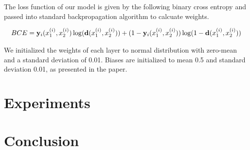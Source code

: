 \documentclass[runningheads]{llncs}
\begin{document}
The loss function of our model is given by the following binary cross entropy and passed into standard backpropagation algorithm to calcuate weights.

\begin{equation}
    \mathnormal{BCE} = 
    \mathbf{y}_{i}(\mathnormal{x}_{1}^{(i)},\mathnormal{x}_{2}^{(i)})
    \log(\mathbf{d}(\mathnormal{x}_{1}^{(i)},\mathnormal{x}_{2}^{(i)}))+
    (1-\mathbf{y}_{i}(\mathnormal{x}_{1}^{(i)},\mathnormal{x}_{2}^{(i)}))
    \log(1-\mathbf{d}(\mathnormal{x}_{1}^{(i)},\mathnormal{x}_{2}^{(i)}))
\end{equation}

We initialized the weights of each layer to normal distribution with zero-mean and a standard deviation of 0.01. Biases are initialized to mean 0.5 and standard deviation 0.01, as presented in the paper\cite{koch2015siamese}. 


\section{Experiments}


\section{Conclusion}

%
%
%
%
%
%






\end{document}

